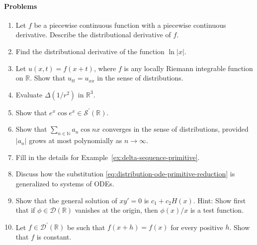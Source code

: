 \paragraph*{Problems}

\begin{enumerate}[label=\thesection.\arabic*.,ref=\thesection.\arabic*,start=20,series=book-problems]

\item\label{ex:piecewise-smooth-distribution-derivative} Let $f$ be a piecewise continuous function with a piecewise continuous derivative. Describe the distributional derivative of $f$.

\item\label{ex:logarithm-distribution-derivative} Find the distributional derivative of the function $\ln|x|$.

\item\label{ex:riemann-integrable-traveling-wave} Let $u(x,t)=f(x+t)$, where $f$ is any locally Riemann integrable function on $\mathbb{R}$. Show that $u_{tt}=u_{xx}$ in the sense of distributions.

\item\label{ex:inverse-square-distribution-laplacian} Evaluate $\Delta(1/r^2)$ in $\mathbb{R}^3$.

\item\label{ex:exponential-oscillation-tempered} Show that $e^x\cos e^x\in\mathcal{S}^{\prime}(\mathbb{R})$.

\item\label{ex:polynomial-cosine-coefficients-distribution} Show that $\sum_{n\in\mathbb{N}}a_n\cos nx$ converges in the sense of distributions, provided $|a_n|$ grows at most polynomially as $n\to\infty$.

\item\label{ex:prove-delta-primitive-conditions} Fill in the details for Example~\ref{ex:delta-sequence-primitive}.

\item\label{ex:distribution-ode-system-substitution} Discuss how the substitution \eqref{eq:distribution-ode-primitive-reduction} is generalized to systems of ODEs.

\item\label{ex:singular-ode-heaviside-general-solution} Show that the general solution of $xy'=0$ is $c_1+c_2H(x)$. Hint: Show first that if $\phi\in\mathcal{D}(\mathbb{R})$ vanishes at the origin, then $\phi(x)/x$ is a test function.

\item\label{ex:translation-invariant-distribution-constant} Let $f\in\mathcal{D}^{\prime}(\mathbb{R})$ be such that $f(x+h)=f(x)$ for every positive $h$. Show that $f$ is constant.


\end{enumerate}
